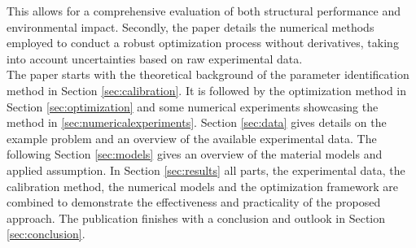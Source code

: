 This allows for a comprehensive evaluation of both structural performance and environmental impact. 
Secondly, the paper details the numerical methods employed to conduct a robust optimization process without derivatives, taking into account uncertainties based on raw experimental data.
\\
The paper starts  with the theoretical background of the parameter identification method in Section \ref{sec:calibration}.
It is followed by the optimization method in Section \ref{sec:optimization} and some numerical experiments showcasing the method in \ref{sec:numericalexperiments}.
Section \ref{sec:data} gives details on the example problem and an overview of the available experimental data.
The following Section \ref{sec:models} gives an overview of the material models and applied assumption. 
In Section \ref{sec:results} all parts, the experimental data, the calibration method, the numerical models and the optimization framework are combined to demonstrate the effectiveness and practicality of the proposed approach.
The publication finishes with a conclusion and outlook in Section \ref{sec:conclusion}.